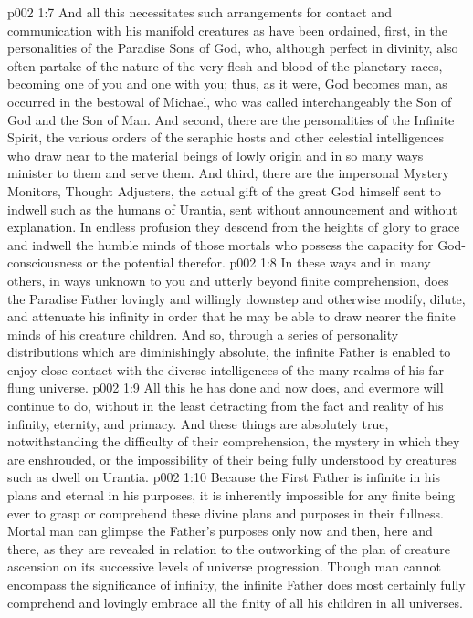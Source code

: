 \vs p002 1:7 And all this necessitates such arrangements for contact and communication with his manifold creatures as have been ordained, first, in the personalities of the Paradise Sons of God, who, although perfect in divinity, also often partake of the nature of the very flesh and blood of the planetary races, becoming one of you and one with you; thus, as it were, God becomes man, as occurred in the bestowal of Michael, who was called interchangeably the Son of God and the Son of Man. And second, there are the personalities of the Infinite Spirit, the various orders of the seraphic hosts and other celestial intelligences who draw near to the material beings of lowly origin and in so many ways minister to them and serve them. And third, there are the impersonal Mystery Monitors, Thought Adjusters, the actual gift of the great God himself sent to indwell such as the humans of Urantia, sent without announcement and without explanation. In endless profusion they descend from the heights of glory to grace and indwell the humble minds of those mortals who possess the capacity for God\hyp{}consciousness or the potential therefor.\plusone
\vs p002 1:8 In these ways and in many others, in ways unknown to you and utterly beyond finite comprehension, does the Paradise Father lovingly and willingly downstep and otherwise modify, dilute, and attenuate his infinity in order that he may be able to draw nearer the finite minds of his creature children. And so, through a series of personality distributions which are diminishingly absolute, the infinite Father is enabled to enjoy close contact with the diverse intelligences of the many realms of his far\hyp{}flung universe.
\vs p002 1:9 All this he has done and now does, and evermore will continue to do, without in the least detracting from the fact and reality of his infinity, eternity, and primacy. And these things are absolutely true, notwithstanding the difficulty of their comprehension, the mystery in which they are enshrouded, or the impossibility of their being fully understood by creatures such as dwell on Urantia.\plusone
\pc \vs p002 1:10 Because the First Father is infinite in his plans and eternal in his purposes, it is inherently impossible for any finite being ever to grasp or comprehend these divine plans and purposes in their fullness. Mortal man can glimpse the Father’s purposes only now and then, here and there, as they are revealed in relation to the outworking of the plan of creature ascension on its successive levels of universe progression. Though man cannot encompass the significance of infinity, the infinite Father does most certainly fully comprehend and lovingly embrace all the finity of all his children in all universes.
